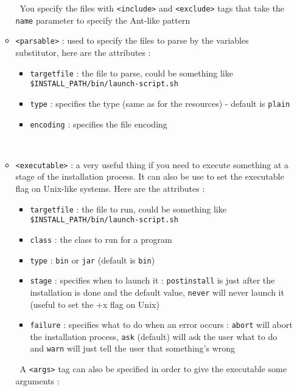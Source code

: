 \begin{itemize}
\begin{itemize}
\begin{itemize}
    \end{itemize}\
    You specify the files with  \texttt{<include>} and \texttt{<exclude>} tags
    that take the \texttt{name} parameter to specify the Ant-like pattern
    \item \texttt{<parsable>} : used to specify the files to parse by the
    variables substitutor, here are the attributes :
    \begin{itemize}
    
      \item \texttt{targetfile} : the file to parse, could be something like\\
      \texttt{\$INSTALL\_PATH/bin/launch-script.sh}
      \item \texttt{type} : specifies the type (same as for the resources) -
      default is \texttt{plain}
      \item \texttt{encoding} : specifies the file encoding
    
    \end{itemize}\
    \item \texttt{<executable>} : a very useful thing if you need to execute
    something at a stage of the installation process. It can also be use to set
    the executable flag on Unix-like systems. Here are the attributes :
    \begin{itemize}
    
      \item \texttt{targetfile} : the file to run, could be something like\\
      \texttt{\$INSTALL\_PATH/bin/launch-script.sh}
      \item \texttt{class} : the class to run for a \Java program
      \item \texttt{type} : \texttt{bin} or \texttt{jar} (default is
      \texttt{bin})
      \item \texttt{stage} : specifies when to launch it : \texttt{postinstall}
      is just after the installation is done and the default value,
      \texttt{never} will never launch it (useful to set the +x flag on Unix)
      \item \texttt{failure} : specifies what to do when an error occurs :
      \texttt{abort} will abort the installation process, \texttt{ask} (default)
      will ask the user what to do and \texttt{warn} will just tell the user
      that something's wrong
    
    \end{itemize}\
    A \texttt{<args>} tag can also be specified in order to give the executable
    some arguments :
    \begin{itemize}
    

\end{itemize}
\end{itemize}
\end{itemize}
